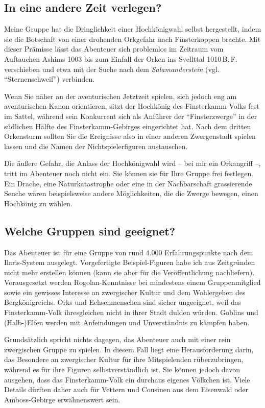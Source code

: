 \documentclass[openright]{Ilaris}
\newcommand{\fkv}{Finsterkamm-Volk }
\newcommand{\fkvs}{Finsterkamm-Volks }
\begin{document}
\subsection{In eine andere Zeit verlegen?}
Meine Gruppe hat die Dringlichkeit einer Hochkönigwahl selbst hergestellt, indem sie die Botschaft von einer drohenden Orkgefahr nach Finsterkoppen brachte.
Mit dieser Prämisse lässt das Abenteuer sich problemlos im Zeitraum vom Auftauchen Ashims 1003 bis zum Einfall der Orken ins Svellttal 1010\,B.\,F. verschieben
und etwa mit der Suche nach dem  \emph{Salamanderstein} (vgl. \enquote{Sternenschweif}) verbinden.

Wenn Sie näher an der aventurischen Jetztzeit spielen, sich jedoch eng am aventurischen Kanon orientieren, sitzt der Hochkönig des \fkvs fest im Sattel,
während sein Konkurrent sich als Anführer der \enquote{Finsterzwerge} in der südlichen Hälfte des Finsterkamm-Gebirges eingerichtet hat.
Nach dem dritten Orkensturm sollten Sie die Ereignisse also in einer anderen Zwergenstadt spielen lassen und die Namen der Nichtspielerfiguren austauschen.

Die äußere Gefahr, die Anlass der Hochkönigwahl wird -- bei mir ein Orkangriff --, tritt im Abenteuer noch nicht ein. Sie können sie für Ihre Gruppe frei festlegen.
Ein Drache, eine Naturkatastrophe oder eine in der Nachbarschaft grassierende Seuche wären beispielsweise andere Möglichkeiten, die die Zwerge bewegen, einen Hochkönig zu wählen.

\subsection{Welche Gruppen sind geeignet?}
Das Abenteuer ist für eine Gruppe von rund 4.000 Erfahrungspunkte nach dem Ilaris-System ausgelegt. Vorgefertigte Beispiel-Figuren habe ich aus Zeitgründen nicht mehr erstellen können (kann sie aber für die Veröffentlichung nachliefern).%
Vorausgesetzt werden Rogolan-Kenntnisse bei mindestens einem Gruppenmitglied sowie ein gewisses Interesse an zwergischer Kultur und dem Wohlergehen des Bergkönigreichs.
Orks und Echsenmenschen sind sicher ungeeignet, weil das \fkv ihresgleichen nicht in ihrer Stadt dulden würden.
Goblins und (Halb-)Elfen werden mit Anfeindungen und Unverständnis zu kämpfen haben.

Grundsätzlich spricht nichts dagegen, das Abenteuer auch mit einer rein zwergischen Gruppe zu spielen.
In diesem Fall liegt eine Herausforderung darin,  das Besondere an zwergischer Kultur für ihre Mitspielenden rüberzubringen, während es für ihre Figuren selbstverständlich ist.
Sie können jedoch davon ausgehen, dass das \fkv ein durchaus eigenes Völkchen ist.
Viele Details dürften daher auch für  Vettern und Cousinen aus dem Eisenwald oder Amboss-Gebirge erwähnenswert sein.
\end{document}
